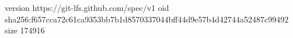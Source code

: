 version https://git-lfs.github.com/spec/v1
oid sha256:f657cca72c61ca9353bb7b1d8570337044bff44d9e57b4d42744a52487c99492
size 174916
